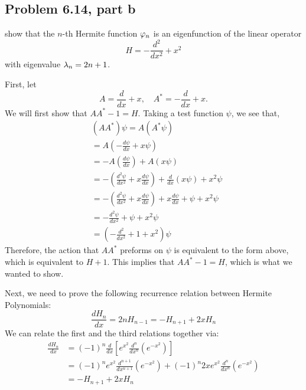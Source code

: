 \subsection{Problem 6.14, part b}
show that the $n$-th Hermite function $\varphi_n$ is an eigenfunction of the linear operator
\[H = -\frac{d^2}{dx^2} + x^2\]
with eigenvalue $\mathrm{\lambda}_n = 2n+1$.
\partbreak
\begin{solution}

    First, let 
    \[A = \frac{d}{dx} + x, \quad A^* = -\frac{d}{dx} + x.\]
    We will first show that $AA^* - 1 = H$. Taking a test function $\psi$, we see that,
    \tightalignbreak
    \begin{align*}
        &(AA^*)\psi = A(A^* \psi) \\
        &= A\left( -\frac{d\psi}{dx} + x\psi \right) \\
        &= -A\left(\frac{d\psi}{dx}\right) + A\left( x\psi\right)\\
        &= -\left( \frac{d^2\psi}{dx^2} + x\frac{d\psi}{dx}\right) + \frac{d}{dx}\left( x\psi\right) + x^2\psi\\
        &= -\left( \frac{d^2\psi}{dx^2} + x\frac{d\psi}{dx}\right) + x\frac{d\psi}{dx} + \psi + x^2\psi\\
        &= - \frac{d^2\psi}{dx^2} + \psi + x^2\psi\\
        &= \left(- \frac{d^2}{dx^2} + 1 + x^2\right)\psi
    \end{align*}\vspace{-10mm}\alignbreak
    Therefore, the action that $AA^*$ preforms on $\psi$ is equivalent to the form above, which is equivalent to $H + 1$. This implies that $AA^* - 1 = H$, which is what we wanted to show.\par

    \newpage
    Next, we need to prove the following recurrence relation between Hermite Polynomials:
    \[\frac{dH_n}{dx} = 2n H_{n-1} = -H_{n+1} + 2xH_n\]
    We can relate the first and the third relations together via:
    \begin{align*}
        \frac{dH_n}{dx} &= (-1)^n\frac{d}{dx}\left[ e^{x^2} \frac{d^n}{dx^n}\left(e^{-x^2}\right)\right]\\
        &= (-1)^n e^{x^2} \frac{d^{n+1}}{dx^{n+1}}\left(e^{-x^2}\right) + (-1)^n 2xe^{x^2}\frac{d^n}{dx^n}\left( e^{-x^2} \right)\\
        &= -H_{n+1} + 2xH_n
    \end{align*}


\end{solution}
